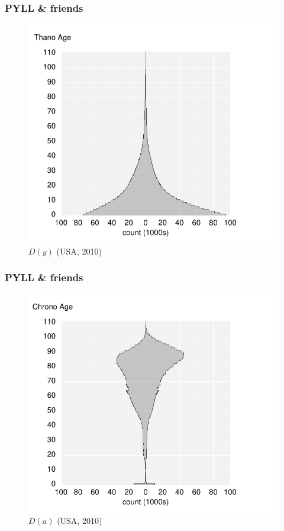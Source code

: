 \documentclass{beamer}
\begin{document}
\begin{frame}
\frametitle{PYLL \& friends}
\vspace{-1cm}
\begin{figure}[b]
    \centering
    \includegraphics[scale=.7]{Figures/f2_Dy.pdf}
    \caption{$D(y)$ (USA, 2010)}
\end{figure} 
\end{frame}
\begin{frame}
\frametitle{PYLL \& friends}
\vspace{-1cm}
\begin{figure}[b]
    \centering
    \includegraphics[scale=.7]{Figures/f3_Da.pdf}
    \caption{$D(a)$ (USA, 2010)}
\end{figure} 
\end{frame}
\end{document}

